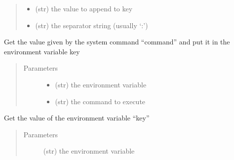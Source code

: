 \documentclass[a4paper,10pt,english]{sphinxmanual}
\begin{document}
\begin{fulllineitems}
\begin{fulllineitems}
\begin{quote}
\begin{description}
\begin{itemize}
\item {} 
 \textendash{} (str) the value to append to key

\item {} 
 \textendash{} (str) the separator string (usually ‘:’)

\end{itemize}

\end{description}\end{quote}

\end{fulllineitems}


\begin{fulllineitems}
\label{\detokenize{apidoc_src/src:src.environment.Environ.command_value}}
Get the value given by the system command “command” 
and put it in the environment variable key
\begin{quote}\begin{description}
\item[{Parameters}] \leavevmode\begin{itemize}
\item {} 
 \textendash{} (str) the environment variable

\item {} 
 \textendash{} (str) the command to execute

\end{itemize}

\end{description}\end{quote}

\end{fulllineitems}


\begin{fulllineitems}
\label{\detokenize{apidoc_src/src:src.environment.Environ.get}}
Get the value of the environment variable “key”
\begin{quote}\begin{description}
\item[{Parameters}] \leavevmode
{} \textendash{} (str) the environment variable


\end{description}
\end{quote}
\end{fulllineitems}
\end{fulllineitems}
\end{document}
